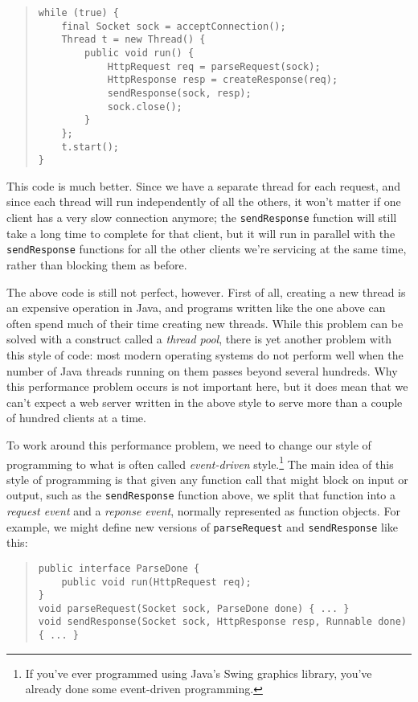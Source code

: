 \documentclass[11pt]{article}
\begin{document}
\begin{quote}
\lstset{language=Java, basicstyle=\small}
\begin{lstlisting}  
while (true) {
    final Socket sock = acceptConnection();
    Thread t = new Thread() {
        public void run() {
            HttpRequest req = parseRequest(sock);
            HttpResponse resp = createResponse(req);
            sendResponse(sock, resp);
            sock.close();
        }
    };
    t.start();
}
\end{lstlisting}
\end{quote}

This code is much better.  Since we have a separate thread for each
request, and since each thread will run independently of all the others,
it won't matter if one client has a very slow connection anymore; the
\texttt{sendResponse} function will still take a long time to complete
for that client, but it will run in parallel with the
\texttt{sendResponse} functions for all the other clients we're
servicing at the same time, rather than blocking them as before.

The above code is still not perfect, however.  First of all, creating a
new thread is an expensive operation in Java, and programs written like
the one above can often spend much of their time creating new threads.
While this problem can be solved with a construct called a \emph{thread
pool}, there is yet another problem with this style of code: most modern
operating systems do not perform well when the number of Java threads
running on them passes beyond several hundreds.  Why this performance
problem occurs is not important here, but it does mean that we can't
expect a web server written in the above style to serve more than a
couple of hundred clients at a time.  

To work around this performance problem, we need to change our style of
programming to what is often called \emph{event-driven}
style.\footnote{If you've ever programmed using Java's Swing graphics
library, you've already done some event-driven programming.}  The main
idea of this style of programming is that given any function call that
might block on input or output, such as the \texttt{sendResponse}
function above, we split that function into a \emph{request event} and a
\emph{reponse event}, normally represented as function objects.  For
example, we might define new versions of \texttt{parseRequest} and
\texttt{sendResponse} like this:

\begin{quote}
\lstset{language=Java, basicstyle=\small}
\begin{lstlisting}  
public interface ParseDone {
    public void run(HttpRequest req);
}
void parseRequest(Socket sock, ParseDone done) { ... }
void sendResponse(Socket sock, HttpResponse resp, Runnable done) { ... }
\end{lstlisting}
\end{quote}
\end{document}
